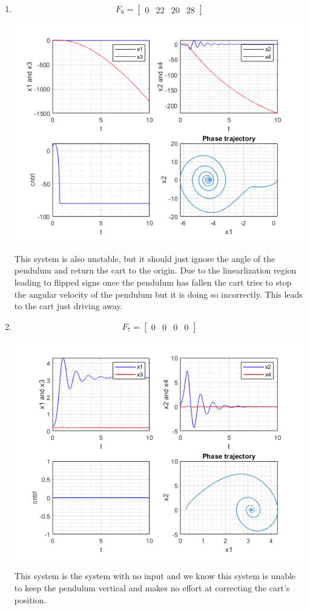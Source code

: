 \documentclass{article}
\begin{document}
\begin{enumerate}[1)]
\item $$ F_6 = \begin{bmatrix} 0 & 22 & 20 & 28 \end{bmatrix} $$
\begin{minipage}{\linewidth}
\centering
\includegraphics[scale=.8]{images/p2-6.png}
\end{minipage}
This system is also unstable, but it should just ignore the angle of the pendulum and return the cart to the origin.
Due to the linearlization region leading to flipped signs once the pendulum has fallen the cart tries to stop the angular velocity of the pendulum but it is doing so incorrectly.
This leads to the cart just driving away.

\newpage
\item $$ F_7 = \begin{bmatrix} 0 & 0 & 0 & 0 \end{bmatrix} $$
\begin{minipage}{\linewidth}
\centering
\includegraphics[scale=.8]{images/p2-7.png}
\end{minipage}
This system is the system with no input and we know this system is unable to keep the pendulum vertical and makes no effort at correcting the cart's position.
\end{enumerate}
\end{document}
